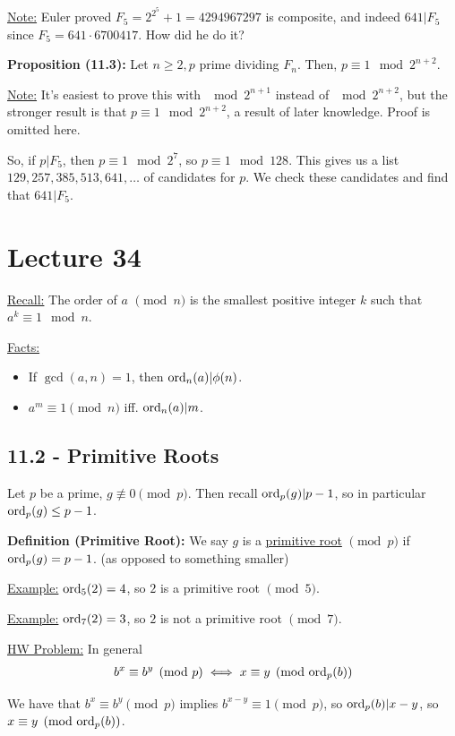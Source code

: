 \documentclass{article}
\newenvironment{aside}{\begin{siderules}\setlength{\leftskip}{0.3cm}}{\end{siderules}\setlength{\leftskip}{0pt}}
\begin{document}
\underline{Note:} Euler proved $F_5=2^{2^5}+1=4294967297$ is composite, and indeed $641|F_5$ since $F_5=641\cdot 6700417$. How did he do it?

\textbf{Proposition (11.3):} Let $n\geq 2, p$ prime dividing $F_n$. Then, $p\equiv 1\mod{2^{n+2}}$.

\underline{Note:} It's easiest to prove this with $\mod{2^{n+1}}$ instead of $\mod{2^{n+2}}$, but the stronger result is that $p\equiv 1\mod{2^{n+2}}$, a result of later knowledge. Proof is omitted here. 

So, if $p|F_5$, then $p\equiv 1\mod{2^7}$, so $p\equiv 1\mod{128}$. This gives us a list $129, 257, 385, 513, 641, \dots$ of candidates for $p$. We check these candidates and find that $641|F_5$.

\section{Lecture 34}

\underline{Recall:} The order of $a$ $\pmod n$ is the smallest positive integer $k$ such that $a^k\equiv 1\mod n$.

\underline{Facts:} \begin{itemize}
    \item If $\gcd(a,n)=1$, then $\text{ord}_n(a)|\phi(n)$.
    \item $a^m\equiv 1\pmod n$ iff. $\text{ord}_n(a)|m$.
\end{itemize}

\subsection{11.2 - Primitive Roots}

Let $p$ be a prime, $g\not\equiv 0\pmod p$. Then recall $\text{ord}_p(g)|p-1$, so in particular $\text{ord}_p(g)\leq p-1$.

\textbf{Definition (Primitive Root):} We say $g$ is a \underline{primitive root} $\pmod p$ if $\text{ord}_p(g)=p-1$. (as opposed to something smaller)

\underline{Example:} $\text{ord}_5(2)=4$, so $2$ is a primitive root $\pmod 5$. 

\underline{Example:} $\text{ord}_7(2)=3$, so $2$ is not a primitive root $\pmod 7$.

\begin{aside}
\underline{HW Problem:} In general \begin{align*}
    b^x\equiv b^y\pmod p\iff x\equiv y\pmod{\text{ord}_p(b)}
\end{align*}

We have that $b^x\equiv b^y\pmod p$ implies $b^{x-y}\equiv 1\pmod p$, so $\text{ord}_p(b)|x-y$, so $x\equiv y\pmod{\text{ord}_p(b)}$.
\end{aside}
\end{document}
